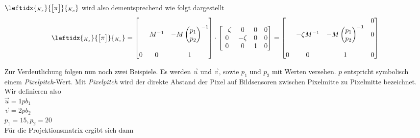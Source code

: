		 $	\leftidx{_{K_{s}}}{\begin{bmatrix}
			\pi
			\end{bmatrix}}{_{K_{c}}} $ wird also dementsprechend wie folgt dargestellt\\
		
		\begin{gather}	\leftidx{_{K_{s}}}{\begin{bmatrix}
			\pi
			\end{bmatrix}}{_{K_{c}}} 
		=
		\begin{bmatrix}
		&&\\
		&M^{-1}& -M\begin{pmatrix}p_1\\p_2\end{pmatrix}^{-1}\\
		&&\\
		0&0&1
		\end{bmatrix}
		\cdot
		\begin{bmatrix}
		-\zeta&0&0&0\\
		0&-\zeta&0&0\\
		0&0&1&0
		\end{bmatrix}
		=
		\begin{bmatrix}
		&&&0\\
		&-\zeta M^{-1}& -M\begin{pmatrix}p_1\\p_2\end{pmatrix}^{-1}&0\\
		&&&\\
		0&0&1&0
		\end{bmatrix}
		\end{gather}
		
		Zur Verdeutlichung folgen nun noch zwei Beispiele. Es werden $\vec{u}$ und $\vec{v}$, sowie $p_1$ und $p_2$ mit Werten versehen. $p$ entspricht symbolisch einem \textit{Pixelpitch}-Wert. Mit \textit{Pixelpitch} wird der direkte Abstand der Pixel auf Bildsensoren zwischen Pixelmitte zu Pixelmitte bezeichnet. Wir definieren also\\
		
		$\vec{u} = 1pb_1 $\\
		$\vec{v} = 2pb_2 $\\
		$ p_1 = 15, p_2 = 20$\\
		
		Für die Projektionsmatrix ergibt sich dann
		
